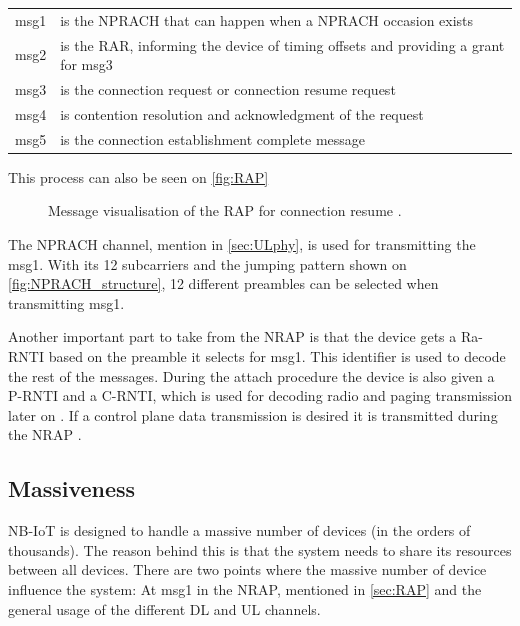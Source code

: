 \begin{tabular}{ll}
msg1 & is the NPRACH that can happen when a NPRACH occasion exists \\
msg2 & is the \gls{RAR}, informing the device of timing offsets and providing a grant for msg3 \\
msg3 & is the connection request or connection resume request \\
msg4 & is contention resolution and acknowledgment of the request \\
msg5 & is the connection establishment complete message\\
\end{tabular}

This process can also be seen on \autoref{fig:RAP}


\begin{figure}[H]
\centering

\caption{Message visualisation of the \gls{RAP} for connection resume \citep{NB-IoT_Book}.}
\label{fig:RAP}
\end{figure}

The NPRACH channel, mention in \autoref{sec:ULphy}, is used for transmitting the msg1. With its 12 subcarriers and the jumping pattern shown on \autoref{fig:NPRACH_structure}, 12 different preambles can be selected when transmitting msg1.

Another important part to take from the \gls{NRAP} is that the device gets a \gls{Ra-RNTI} based on the preamble it selects for msg1. This identifier is used to decode the rest of the messages. During the attach procedure the device is also given a \gls{P-RNTI} and a \gls{C-RNTI}, which is used for decoding radio and paging transmission later on \citep{whitepaper}. If a control plane data transmission is desired it is transmitted during the \gls{NRAP} \citep{primer}.

\subsection{Massiveness}
NB-IoT is designed to handle a massive number of devices (in the orders of thousands). The reason behind this is that the system needs to share its resources between all devices. There are two points where the massive number of device influence the system: At msg1 in the NRAP, mentioned in \autoref{sec:RAP} and the general usage of the different DL and UL channels.

